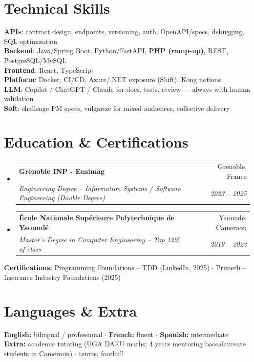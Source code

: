 \documentclass[letterpaper,10.5pt]{article}
\makeatletter
\newcommand{\resumeSubheading}[4]{
  \vspace{-1pt}\item
    \begin{tabular*}{0.97\textwidth}[t]{l@{\extracolsep{\fill}}r}
      \textbf{#1} & #2 \\
      \textit{\small#3} & \textit{\small #4} \\
    \end{tabular*}\vspace{-5pt}
}
\newcommand{\resumeSubHeadingListStart}{\begin{itemize}[leftmargin=0.15in, label={}]}
\newcommand{\resumeSubHeadingListEnd}{\end{itemize}}
\makeatother
\begin{document}
\section{Technical Skills}

\begin{itemize}[leftmargin=0.15in, label={}]
  \small{\item{
\textbf{APIs}: contract design, endpoints, versioning, auth, OpenAPI/specs, debugging, SQL optimization \\
\textbf{Backend}: Java/Spring Boot, Python/FastAPI, \textbf{PHP (ramp-up)}, REST, PostgreSQL/MySQL \\
\textbf{Frontend}: React, TypeScript \\
\textbf{Platform}: Docker, CI/CD, Azure/.NET exposure (Shift), Kong notions \\
\textbf{LLM}: Copilot / ChatGPT / Claude for docs, tests, review --- always with human validation \\
\textbf{Soft}: challenge PM specs, vulgarize for mixed audiences, collective delivery
  }}
\end{itemize}
\section{Education \& Certifications}

\resumeSubHeadingListStart
  \resumeSubheading
    {Grenoble INP - Ensimag}{Grenoble, France}
    {Engineering Degree -- Information Systems / Software Engineering (Double Degree)}{2023 -- 2025}
  \resumeSubheading
    {\'Ecole Nationale Sup\'erieure Polytechnique de Yaound\'e}{Yaound\'e, Cameroon}
    {Master's Degree in Computer Engineering -- Top 12\% of class}{2019 -- 2023}
\resumeSubHeadingListEnd
\small{
\textbf{Certifications:} Programming Foundations -- TDD (LinkedIn, 2025) $\cdot$ Primerli -- Insurance Industry Foundations (2025)
}

\section{Languages \& Extra}
\small{
\textbf{English:} bilingual / professional $\cdot$ \textbf{French:} fluent $\cdot$ \textbf{Spanish:} intermediate \\
\textbf{Extra:} academic tutoring (UGA DAEU maths; 4 years mentoring baccalaureate students in Cameroon) $\cdot$ tennis, football
}
\end{document}
